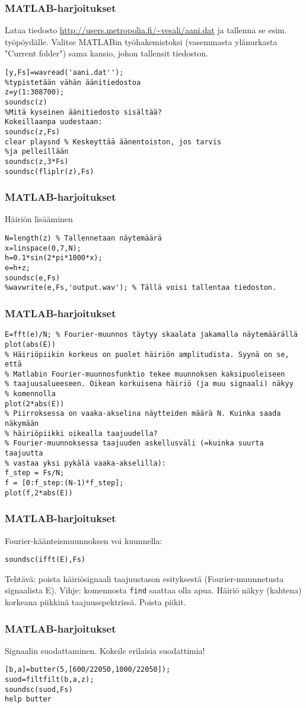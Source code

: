 \begin{frame}[fragile]
\frametitle{MATLAB-harjoitukset}
\small Lataa tiedosto \url{http://users.metropolia.fi/~vesali/aani.dat} ja tallenna se esim. työpöydälle.
Valitse MATLABin työhakemistoksi (vasemmasta ylänurkasta "Current folder") sama kansio, johon
tallensit tiedoston.
\begin{verbatim}
[y,Fs]=wavread('aani.dat'');
%typistetään vähän äänitiedostoa
z=y(1:308700);
soundsc(z)
%Mitä kyseinen äänitiedosto sisältää?
Kokeillaanpa uudestaan:
soundsc(z,Fs)
clear playsnd % Keskeyttää äänentoiston, jos tarvis
%ja pelleillään
soundsc(z,3*Fs)
soundsc(fliplr(z),Fs)
\end{verbatim}
\end{frame}




\begin{frame}[fragile]
\frametitle{MATLAB-harjoitukset}
Häiriön lisääminen
\small
\begin{verbatim}
N=length(z) % Tallennetaan näytemäärä
x=linspace(0,7,N);
h=0.1*sin(2*pi*1000*x);
e=h+z;
soundsc(e,Fs)
%wavwrite(e,Fs,'output.wav'); % Tällä voisi tallentaa tiedoston.
\end{verbatim}
\end{frame}

\begin{frame}[fragile]
\frametitle{MATLAB-harjoitukset}
\footnotesize
\begin{verbatim}
E=fft(e)/N; % Fourier-muunnos täytyy skaalata jakamalla näytemäärällä
plot(abs(E))
% Häiriöpiikin korkeus on puolet häiriön amplitudista. Syynä on se, että
% Matlabin Fourier-muunnosfunktio tekee muunnoksen kaksipuoleiseen
% taajuusalueeseen. Oikean korkuisena häiriö (ja muu signaali) näkyy
% komennolla
plot(2*abs(E))
% Piirroksessa on vaaka-akselina näytteiden määrä N. Kuinka saada näkymään
% häiriöpiikki oikealla taajuudella?
% Fourier-muunnoksessa taajuuden askellusväli (=kuinka suurta taajuutta
% vastaa yksi pykälä vaaka-akselilla):
f_step = Fs/N;
f = [0:f_step:(N-1)*f_step];
plot(f,2*abs(E))
\end{verbatim}
\end{frame}

\begin{frame}[fragile]
\frametitle{MATLAB-harjoitukset}
Fourier-käänteismuunnoksen voi kuunnella:
\small
\begin{verbatim}
soundsc(ifft(E),Fs)
\end{verbatim}
Tehtävä: poista häiriösignaali taajuustason esityksestä (Fourier-muunnetusta signaalista E). Vihje: komennosta \verb+find+
saattaa olla apua. Häiriö näkyy (kahtena) korkeana piikkinä taajuusspektrissä. Poista piikit.
\end{frame}


\begin{frame}[fragile]
\frametitle{MATLAB-harjoitukset}
Signaalin suodattaminen. Kokeile erilaisia suodattimia!
\small
\begin{verbatim}
[b,a]=butter(5,[600/22050,1000/22050]);
suod=filtfilt(b,a,z);
soundsc(suod,Fs)
help butter
\end{verbatim}
\end{frame}
